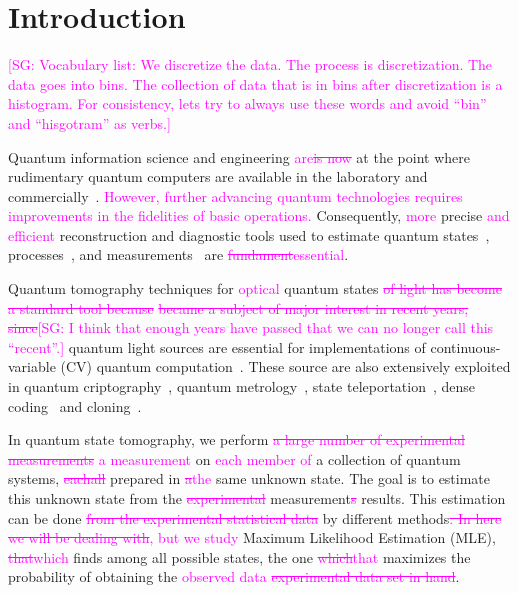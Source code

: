\documentclass[
reprint,
superscriptaddress,
showpacs,
amsmath,
amssymb,
aps,
pra,
longbibliography
]{revtex4-1}
\providecommand{\aucmnt}[1]{#1}
\providecommand{\editcolor}[2]{\textcolor{#1}{#2}}
\providecommand{\aucmnt}[1]{}
\providecommand{\editcolor}[2]{#2}
\newcommand{\SG}[1]{\editcolor{magenta}{#1}}
\newcommand{\SGs}[1]{\aucmnt{\editcolor{magenta}{\sout{#1}}}}
\newcommand{\SGc}[1]{\aucmnt{\editcolor{magenta}{[SG: #1]}}}
\begin{document}

\section{Introduction}
\label{intro}
\SGc{Vocabulary list: We discretize the data.  The process is
  discretization.  The data goes into bins.  The collection of data
  that is in bins after discretization is a histogram.  For
  consistency, lets try to always use these words and avoid ``bin''
  and ``hisgotram'' as verbs.}

Quantum information science and engineering \SG{are}\SGs{is now} at
the point where rudimentary quantum computers are available in the
laboratory and
commercially~\cite{kandala2017,Linke2017,Monk2017,Denchev2016}.
\SG{However, further advancing quantum technologies requires
  improvements in the fidelities of basic operations.}  Consequently,
\SG{more} precise \SG{and efficient} reconstruction and diagnostic
tools used to estimate quantum states~\cite{Vogel1989, Smithey1993,
  Dunn1995, Banaszek1999, Banaszek2000, White2002, Ourjoumtsev2007,
  Neergaard2006}, processes~\cite{Chuang1997, Poyatos1997,
  Altepeter2003, Dariano1998, Nielsen1998, Mitchell2003,
  Obrien2004,Kupchak2015}, and measurements~\cite{Luis1999,
  Fiurasek2001, Dariano2004, Lundeen2009} are
\SGs{fundament}\SG{essential}.

Quantum tomography techniques for \SG{optical} quantum states \SGs{of
  light has become a standard tool because} \SGs{became a subject of
  major interest in recent years, since}\SGc{I think that enough years
  have passed that we can no longer call this ``recent''.} quantum
light sources are essential for implementations of continuous-variable
(CV) quantum computation~\cite{Lloyd1999, Gottesman2001, Bartlett2002,
  Jeong2002, Ralph2003}.  These source are also extensively exploited
in quantum criptography~\cite{Ralph1999, Hillery2000, Silberhorn2002,
  Pirandola2008, Luiz2017}, quantum metrology~\cite{Eberle2010,
  Demkowicz2013}, state teleportation~\cite{Vaidman1994,
  Braunstein1998, He2015}, dense coding~\cite{Braunstein2000, Lee2014}
and cloning~\cite{Cerf2000, Braunstein2001}.

In quantum state tomography, we perform \SGs{a large number of
  experimental measurements} \SG{a measurement} on \SG{each member of}
a collection of quantum systems, \SGs{each}\SGs{all} prepared in
\SGs{a}\SG{the} same unknown state. The goal is to estimate this
unknown state from the \SGs{experimental} measurement\SGs{s}
results. This estimation can be done \SGs{from the experimental
  statistical data} by different methods\SGs{. In here we will be
  dealing with}\SG{, but we study} Maximum Likelihood Estimation
(MLE), \SGs{that}\SG{which} finds among all possible states, the one
\SGs{which}\SG{that} maximizes the probability of obtaining the
\SG{observed data}\SGs{ experimental data set in hand}.
\end{document}
